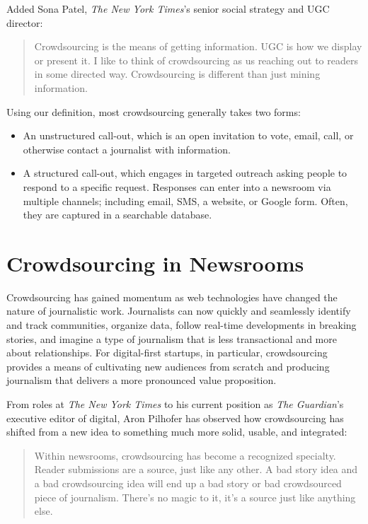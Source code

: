 \documentclass[notoc, symmetric, nobib, nols]{towcenter-guideto-book}
\begin{document}
Added Sona Patel, \textit{The New York Times}'s senior social strategy and UGC director: 

\begin{quote}Crowdsourcing is the means of getting information. UGC is how we display or present it. I like to think of crowdsourcing as us reaching out to readers in some directed way. Crowdsourcing is different than just mining information.%
\end{quote}

Using our definition, most crowdsourcing generally takes two forms:
\begin{itemize}
\item An unstructured call-out, which is an open invitation to vote, email, call, or otherwise contact a journalist with information.
\item A structured call-out, which engages in targeted outreach asking people to respond to a specific request. Responses can enter into a newsroom via multiple channels; including email, SMS, a website, or Google form. Often, they are captured in a searchable database.
\end{itemize}

\chapter{Crowdsourcing in Newsrooms}  

Crowdsourcing has gained momentum as web technologies have changed the nature of journalistic work. Journalists can now quickly and seamlessly identify and track communities, organize data, follow real-time developments in breaking stories, and imagine a type of journalism that is less transactional and more about relationships. For digital-first startups, in particular, crowdsourcing provides a means of cultivating new audiences from scratch and producing journalism that delivers a more pronounced value proposition. 

From roles at \textit{The New York Times} to his current position as \textit{The Guardian}'s executive editor of digital, Aron Pilhofer has observed how crowdsourcing has shifted from a new idea to something much more solid, usable, and integrated: 
\begin{quote}
Within newsrooms, crowdsourcing has become a recognized specialty. Reader submissions are a source, just like any other. A bad story idea and a bad crowdsourcing idea will end up a bad story or bad crowdsourced piece of journalism. There's no magic to it, it's a source just like anything else.%
\end{quote}
\end{document}

